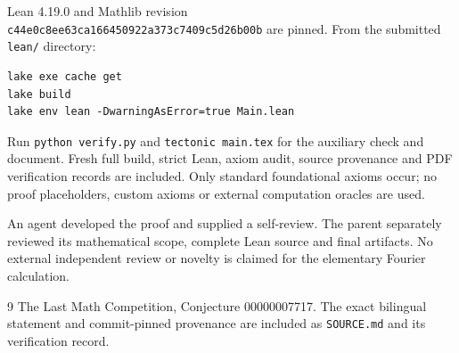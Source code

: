 \documentclass[11pt]{article}
\begin{document}
Lean 4.19.0 and Mathlib revision\\
\texttt{c44e0c8ee63ca166450922a373c7409c5d26b00b}
are pinned. From the submitted \texttt{lean/} directory:
\begin{verbatim}
lake exe cache get
lake build
lake env lean -DwarningAsError=true Main.lean
\end{verbatim}
Run \texttt{python verify.py} and \texttt{tectonic main.tex}
for the auxiliary check and document. Fresh full build,
strict Lean, axiom audit, source provenance and PDF
verification records are included. Only standard
foundational axioms occur; no proof placeholders,
custom axioms or external computation oracles are used.

An agent developed the proof and supplied a self-review.
The parent separately reviewed its mathematical scope,
complete Lean source and final artifacts. No external
independent review or novelty is claimed for the elementary
Fourier calculation.

\begin{thebibliography}{9}
 The Last Math Competition,
Conjecture 00000007717. The exact bilingual statement and
commit-pinned provenance are included as \texttt{SOURCE.md}
and its verification record.
\end{thebibliography}
\end{document}
